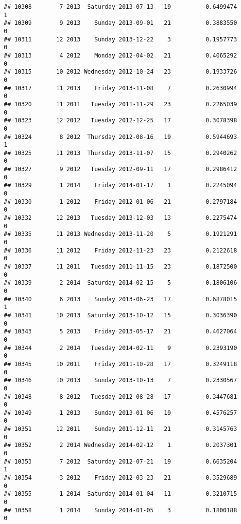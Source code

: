 \documentclass[
]{article}
\begin{document}
\begin{verbatim}
## 10308        7 2013  Saturday 2013-07-13   19          0.6499474             1
## 10309        9 2013    Sunday 2013-09-01   21          0.3883550             0
## 10311       12 2013    Sunday 2013-12-22    3          0.1957773             0
## 10313        4 2012    Monday 2012-04-02   21          0.4065292             0
## 10315       10 2012 Wednesday 2012-10-24   23          0.1933726             0
## 10317       11 2013    Friday 2013-11-08    7          0.2630994             0
## 10320       11 2011   Tuesday 2011-11-29   23          0.2265039             0
## 10323       12 2012   Tuesday 2012-12-25   17          0.3078398             0
## 10324        8 2012  Thursday 2012-08-16   19          0.5944693             1
## 10325       11 2013  Thursday 2013-11-07   15          0.2940262             0
## 10327        9 2012   Tuesday 2012-09-11   17          0.2986412             0
## 10329        1 2014    Friday 2014-01-17    1          0.2245094             0
## 10330        1 2012    Friday 2012-01-06   21          0.2797184             0
## 10332       12 2013   Tuesday 2013-12-03   13          0.2275474             0
## 10335       11 2013 Wednesday 2013-11-20    5          0.1921291             0
## 10336       11 2012    Friday 2012-11-23   23          0.2122618             0
## 10337       11 2011   Tuesday 2011-11-15   23          0.1872500             0
## 10339        2 2014  Saturday 2014-02-15    5          0.1806106             0
## 10340        6 2013    Sunday 2013-06-23   17          0.6878015             1
## 10341       10 2013  Saturday 2013-10-12   15          0.3036390             0
## 10343        5 2013    Friday 2013-05-17   21          0.4627064             0
## 10344        2 2014   Tuesday 2014-02-11    9          0.2393190             0
## 10345       10 2011    Friday 2011-10-28   17          0.3249118             0
## 10346       10 2013    Sunday 2013-10-13    7          0.2330567             0
## 10348        8 2012   Tuesday 2012-08-28   17          0.3447681             0
## 10349        1 2013    Sunday 2013-01-06   19          0.4576257             0
## 10351       12 2011    Sunday 2011-12-11   21          0.3145763             0
## 10352        2 2014 Wednesday 2014-02-12    1          0.2037301             0
## 10353        7 2012  Saturday 2012-07-21   19          0.6635204             1
## 10354        3 2012    Friday 2012-03-23   21          0.3529689             0
## 10355        1 2014  Saturday 2014-01-04   11          0.3210715             0
## 10358        1 2014    Sunday 2014-01-05    3          0.1800188             0

\end{verbatim}
\end{document}
